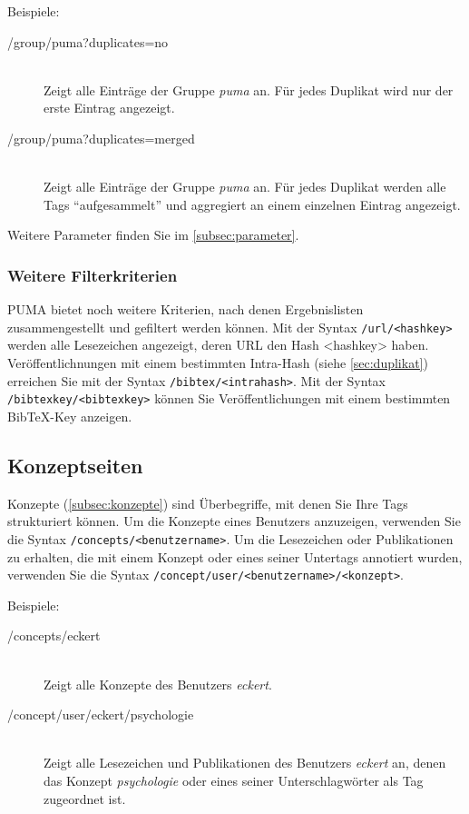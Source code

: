 Beispiele:
\begin{description}
    \item [/group/puma?duplicates=no] \hfill \\
    Zeigt alle Einträge der Gruppe \textit{puma} an. Für jedes Duplikat wird nur der erste Eintrag angezeigt.
    \item [/group/puma?duplicates=merged] \hfill \\
    Zeigt alle Einträge der Gruppe \textit{puma} an. Für jedes Duplikat werden alle Tags \enquote{aufgesammelt} und aggregiert an einem einzelnen Eintrag angezeigt.
\end{description}

Weitere Parameter finden Sie im \autoref{subsec:parameter}.

\subsubsection*{Weitere Filterkriterien}
\label{sss:weitereKriterien}

PUMA bietet noch weitere Kriterien, nach denen Ergebnislisten zusammengestellt und gefiltert werden können. Mit der Syntax \texttt{/url/<hashkey>} werden alle Lesezeichen angezeigt, deren URL den Hash <hashkey> haben. Veröffentlichnungen mit einem bestimmten Intra-Hash (siehe \autoref{sec:duplikat}) erreichen Sie mit der Syntax \texttt{/bibtex/<intrahash>}. Mit der Syntax \texttt{/bibtexkey/<bibtexkey>} können Sie Veröffentlichungen mit einem bestimmten BibTeX-Key anzeigen.


\subsection{Konzeptseiten}
\label{subsec:konzeptseiten}
Konzepte (\autoref{subsec:konzepte}) sind Überbegriffe, mit denen Sie Ihre Tags strukturiert können. Um die Konzepte eines Benutzers anzuzeigen, verwenden Sie die Syntax \texttt{/concepts/<benutzername>}. Um die Lesezeichen oder Publikationen zu erhalten, die mit einem Konzept oder eines seiner Untertags annotiert wurden, verwenden Sie die Syntax \texttt{/concept/user/<benutzername>/<konzept>}.

Beispiele:
\begin{description}
    \item [/concepts/eckert] \hfill \\
    Zeigt alle Konzepte des Benutzers \textit{eckert}.
    \item [/concept/user/eckert/psychologie] \hfill \\
    Zeigt alle Lesezeichen und Publikationen des Benutzers \textit{eckert} an, denen das Konzept \textit{psychologie} oder eines seiner Unterschlagwörter als Tag zugeordnet ist. 
\end{description}


